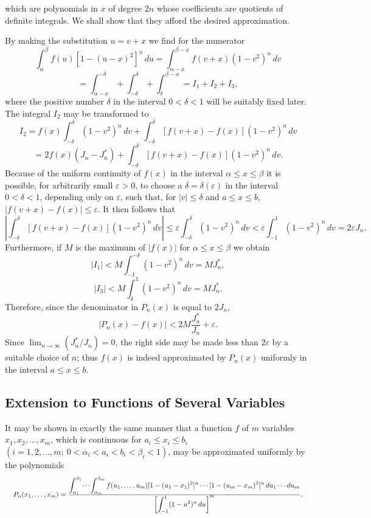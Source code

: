 which are polynomials in $x$ of degree $2n$ whose coefficients are quotients of definite integrals. We shall show that they afford the desired approximation.

By making the substitution $u=v+x$ we find for the numerator
\[
\int_{\alpha}^{\beta} f(u)[1-(u-x)^2]^n\,du
 =\int_{\alpha-x}^{\beta-x} f(v+x)(1-v^2)^n\,dv
\]
\[
 =\int_{\alpha-x}^{-\delta}+\int_{-\delta}^{\delta}+\int_{\delta}^{\beta-x}
 = I_1+I_2+I_3,
\]
where the positive number $\delta$ in the interval $0<\delta<1$ will be suitably fixed later. The integral $I_2$ may be transformed to
\[
I_2=f(x)\int_{-\delta}^{\delta}(1-v^2)^n\,dv
 +\int_{-\delta}^{\delta}[f(v+x)-f(x)](1-v^2)^n\,dv
\]
\[
=2f(x)(J_n-J_n^*)
 +\int_{-\delta}^{\delta}[f(v+x)-f(x)](1-v^2)^n\,dv.
\]
Because of the uniform continuity of $f(x)$ in the interval $\alpha\le x\le\beta$ it is possible, for arbitrarily small $\varepsilon>0$, to choose a $\delta=\delta(\varepsilon)$ in the interval $0<\delta<1$, depending only on $\varepsilon$, such that, for $|v|\le\delta$ and $a\le x\le b$, $|f(v+x)-f(x)|\le\varepsilon$. It then follows that
\[
\left|\int_{-\delta}^{\delta}[f(v+x)-f(x)](1-v^2)^n\,dv\right|
\le \varepsilon\int_{-\delta}^{\delta}(1-v^2)^n\,dv
<\varepsilon\int_{-1}^{1}(1-v^2)^n\,dv
=2\varepsilon J_n.
\]
Furthermore, if $M$ is the maximum of $|f(x)|$ for $\alpha\le x\le\beta$ we obtain
\[
|I_1|<M\int_{-1}^{-\delta}(1-v^2)^n\,dv=MJ_n^*,
\]
\[
|I_3|<M\int_{\delta}^{1}(1-v^2)^n\,dv=MJ_n^*.
\]
Therefore, since the denominator in $P_n(x)$ is equal to $2J_n$,
\[
|P_n(x)-f(x)|<2M\frac{J_n^*}{J_n}+\varepsilon.
\]
Since $\lim_{n\to\infty}(J_n^*/J_n)=0$, the right side may be made less than $2\varepsilon$ by a suitable choice of $n$; thus $f(x)$ is indeed approximated by $P_n(x)$ uniformly in the interval $a\le x\le b$.

\subsection{Extension to Functions of Several Variables}
It may be shown in exactly the same manner that a function $f$ of $m$ variables $x_1,x_2,\ldots,x_m$, which is continuous for $a_i\le x_i\le b_i$ $(i=1,2,\ldots,m;\ 0<\alpha_i<a_i<b_i<\beta_i<1)$, may be approximated uniformly by the polynomials
\[
\resizebox{0.98\textwidth}{!}{$
P_n(x_1,\ldots,x_m)=
\frac{\displaystyle
\int_{\alpha_1}^{\beta_1}\!\cdots\!\int_{\alpha_m}^{\beta_m}
 f(u_1,\ldots,u_m)
 [1-(u_1-x_1)^2]^n\cdots[1-(u_m-x_m)^2]^n
 \,du_1\cdots du_m}
{\displaystyle\left[\int_{-1}^{1}(1-u^2)^n\,du\right]^m}
$}.
\]

